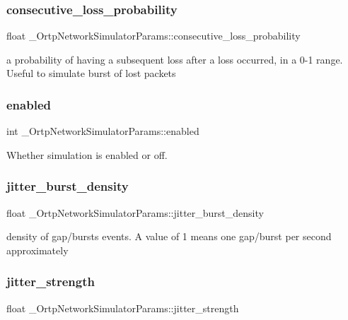 \subsubsection{consecutive\+\_\+loss\+\_\+probability}
{\footnotesize\ttfamily float \+\_\+\+Ortp\+Network\+Simulator\+Params\+::consecutive\+\_\+loss\+\_\+probability}

a probability of having a subsequent loss after a loss occurred, in a 0-\/1 range. Useful to simulate burst of lost packets \mbox{\label{struct__OrtpNetworkSimulatorParams_a4ee678eaa1feccef5bd02067bee9e224}} 
\subsubsection{enabled}
{\footnotesize\ttfamily int \+\_\+\+Ortp\+Network\+Simulator\+Params\+::enabled}

Whether simulation is enabled or off. \mbox{\label{struct__OrtpNetworkSimulatorParams_af8e7c490024ac8048a5ff4424de32209}} 
\subsubsection{jitter\+\_\+burst\+\_\+density}
{\footnotesize\ttfamily float \+\_\+\+Ortp\+Network\+Simulator\+Params\+::jitter\+\_\+burst\+\_\+density}

density of gap/bursts events. A value of 1 means one gap/burst per second approximately \mbox{\label{struct__OrtpNetworkSimulatorParams_a6cca503f6ba1d461c5a0ccc15ba08a69}} 
\subsubsection{jitter\+\_\+strength}
{\footnotesize\ttfamily float \+\_\+\+Ortp\+Network\+Simulator\+Params\+::jitter\+\_\+strength}

